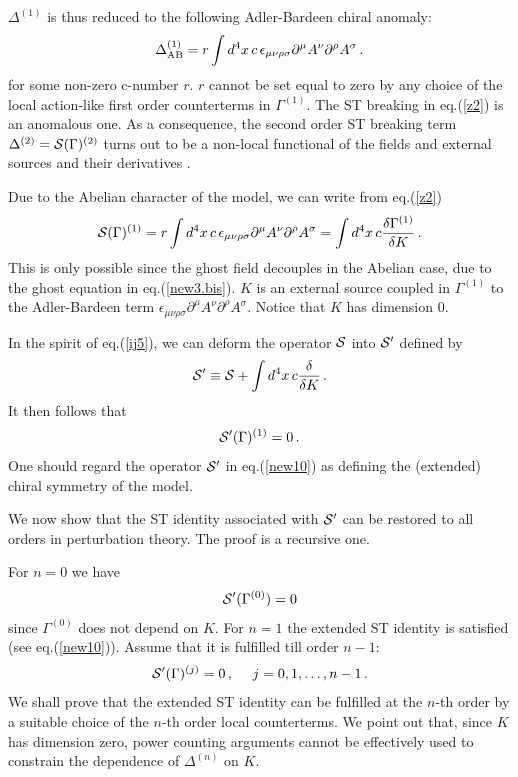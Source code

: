 \documentclass[a4paper,11pt]{article}
\def\G{\Gamma}
\begin{document}
$\Delta^{(1)}$ is thus reduced to the following
Adler-Bardeen chiral anomaly:
%
\begin{eqnarray}
\Delta^{(1)}_{\rm AB} = r
 \int d^4x  \, c \,
\epsilon_{\mu \nu \rho \sigma} \partial^\mu A^\nu 
\partial^\rho A^\sigma \,.
\label{z2}
\end{eqnarray}
%
for some non-zero c-number $r$.
$r$ cannot be set equal to zero
by any choice of the local action-like first order counterterms
in $\G^{(1)}$.
The  ST breaking in eq.(\ref{z2}) is an anomalous one.
As a consequence, the second order ST breaking term $\Delta^{(2)} = {\cal S}(\G)^{(2)}$ turns out to be
a non-local functional of the fields and external sources and their derivatives \cite{pq}.

Due to the Abelian character of the model,
we can write from eq.(\ref{z2})
%
\begin{eqnarray}
{\cal S}(\G)^{(1)} =  r
 \int d^4x  \, c \,
\epsilon_{\mu \nu \rho \sigma} \partial^\mu A^\nu 
\partial^\rho A^\sigma = 
\int d^4x \, c {\delta \G^{(1)} \over \delta K} \, .
\label{z3}
\end{eqnarray}
%
This is only possible since the ghost field decouples in the Abelian case,
due to the ghost equation in eq.(\ref{new3.bis}).
$K$ is an external source coupled in $\G^{(1)}$ to the Adler-Bardeen term 
$\epsilon_{\mu \nu \rho \sigma} \partial^\mu A^\nu \partial^\rho A^\sigma$.
Notice that $K$ has dimension $0$.


In the spirit of eq.(\ref{ij5}), we can deform the operator ${\cal S}$ 
into ${\cal S}'$ defined by
%
\begin{eqnarray}
{\cal S}' \equiv {\cal S} + \int d^4x \, c {\delta \over \delta K} \, .
\label{new9}
\end{eqnarray}
%
It then follows that
%
\begin{eqnarray}
{\cal S}' (\G)^{(1)}=0 \, .
\label{new10}
\end{eqnarray}
%
One should regard the operator ${\cal S}'$
in eq.(\ref{new10}) as defining the
(extended) chiral symmetry of the model.

We now show that the ST identity associated with ${\cal S}'$ can
be restored to all orders in perturbation theory.
The proof is a recursive one.

For $n=0$  we have
%
\begin{eqnarray}
{\cal S}'(\G^{(0)}) = 0 
\label{new11}
\end{eqnarray}
%
since $\G^{(0)}$ does not depend on $K$.
For $n=1$ the extended ST identity is satisfied (see eq.(\ref{new10})).
Assume that it is fulfilled till order $n-1$:
%
\begin{eqnarray}
{\cal S}'(\G)^{(j)}=0 \, , ~~~~ j=0,1,\dots,n-1 \, .
\label{new11.bis}
\end{eqnarray}
%
We shall prove that
the extended ST identity can be fulfilled at the $n$-th order by
a suitable choice of the $n$-th order local counterterms.
We point out that, since $K$ has dimension zero, power counting arguments
cannot be effectively 
used to constrain the dependence of $\Delta^{(n)}$ on $K$.
\end{document}
